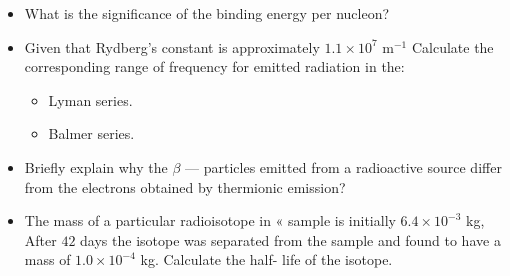 \documentclass{article}
\begin{document}
\begin{itemize}
\item What is the significance of the binding energy per nucleon? 
\item Given that Rydberg’s constant is approximately $ 1.1 \times 10^{7}$ m$ ^{-1}$ Calculate the corresponding range of frequency for emitted radiation in the:
 \begin{itemize}
\item Lyman series. 
\item Balmer series. 
\end{itemize}
\item Briefly explain why the $ \beta$  — particles emitted from a radioactive source differ from the electrons obtained by thermionic emission? 
\item The mass of a particular radioisotope in « sample is initially $ 6.4 \times 10^{-3}$ kg, After $ 42$ days the isotope was separated from the sample and found to have a mass of $ 1.0 \times 10^{-4}$ kg. Calculate the half- life of the isotope.
\end{itemize}
\end{document}
